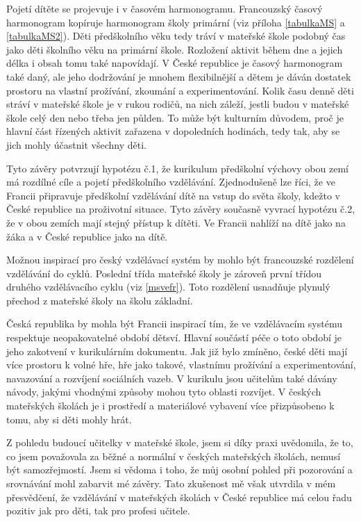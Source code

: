 Pojetí dítěte se projevuje i v časovém harmonogramu. Francouzský časový harmonogram kopíruje harmonogram školy primární (viz příloha \ref{tabulkaMS} a \ref{tabulkaMS2}). Děti předškolního věku tedy tráví v mateřské škole podobný čas jako děti školního věku na primární škole. Rozložení aktivit během dne a jejich délka i obsah tomu také napovídají. V České republice je časový harmonogram také daný, ale jeho dodržování je mnohem flexibilnější a dětem je dáván dostatek prostoru na vlastní prožívání, zkoumání a experimentování. Kolik času denně  děti stráví v mateřské škole je v rukou rodičů, na nich záleží, jestli budou v mateřské škole celý den nebo třeba jen půlden. To může být kulturním důvodem, proč je hlavní část řízených aktivit zařazena v dopoledních hodinách, tedy tak, aby se jich mohly účastnit všechny děti. 

Tyto závěry potvrzují hypotézu č.1, že kurikulum předškolní výchovy obou zemí má rozdílné cíle a pojetí předškolního vzdělávání. Zjednodušeně lze říci, že ve Francii připravuje předškolní vzdělávání dítě na vstup do světa školy, kdežto v České republice na proživotní situace. Tyto závěry současně vyvrací hypotézu č.2, že v obou zemích mají stejný přístup k dítěti. Ve Francii nahlíží na dítě jako na žáka a v České republice jako na dítě. 

Možnou inspirací pro český vzdělávací systém by mohlo být francouzské rozdělení vzdělávání do cyklů. Poslední třída mateřské školy je zároveň první třídou druhého vzdělávacího cyklu (viz \ref{msvefr}). Toto rozdělení usnadňuje plynulý přechod z mateřské školy na školu základní. 

Česká republika by mohla být Francii inspirací tím, že ve vzdělávacím systému respektuje neopakovatelné období dětsví. Hlavní součástí péče o toto období je jeho zakotvení v kurikulárním dokumentu. Jak již bylo zmíněno, české děti mají více prostoru k volné hře, hře jako takové, vlastnímu prožívání a experimentování, navazování a rozvíjení sociálních vazeb. V kurikulu jsou učitelům také dávány návody, jakými vhodnými způsoby mohou tyto oblasti rozvíjet. V českých mateřských školách je i prostředí a materiálové vybavení více přizpůsobeno k tomu, aby si děti mohly hrát.

Z pohledu budoucí učitelky v mateřské škole, jsem si díky praxi uvědomila, že to, co jsem považovala za běžné a normální v českých mateřských školách, nemusí být samozřejmostí. Jsem si vědoma i toho, že můj osobní pohled při pozorování a srovnávání mohl zabarvit mé závěry. Tato zkušenost mě však utvrdila v mém přesvědčení, že vzdělávání v mateřských školách v České republice má celou řadu pozitiv jak pro děti, tak pro profesi učitele. 